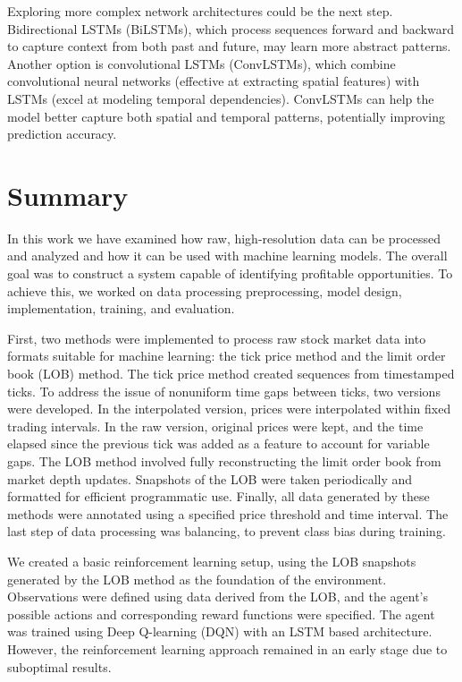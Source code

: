 \documentclass[a4paper,oneside,onecolumn,12pt]{book}
\begin{document}
	Exploring more complex network architectures could be the next step. Bidirectional LSTMs (BiLSTMs), which process sequences forward and backward to capture context from both past and future, may learn more abstract patterns. Another option is convolutional LSTMs (ConvLSTMs), which combine convolutional neural networks (effective at extracting spatial features) with LSTMs (excel at modeling temporal dependencies). ConvLSTMs can help the model better capture both spatial and temporal patterns, potentially improving prediction accuracy.
	\pagebreak

\section*{Summary}
In this work we have examined how raw, high-resolution data can be processed and analyzed and how it can be used with machine learning models. The overall goal was to construct a system capable of identifying profitable opportunities. To achieve this, we worked on data processing preprocessing, model design, implementation, training, and evaluation.

First, two methods were implemented to process raw stock market data into formats suitable for machine learning: the tick price method and the limit order book (LOB) method. The tick price method created sequences from timestamped ticks. To address the issue of nonuniform time gaps between ticks, two versions were developed. In the interpolated version, prices were interpolated within fixed trading intervals. In the raw version, original prices were kept, and the time elapsed since the previous tick was added as a feature to account for variable gaps. The LOB method involved fully reconstructing the limit order book from market depth updates. Snapshots of the LOB were taken periodically and formatted for efficient programmatic use. Finally, all data generated by these methods were annotated using a specified price threshold and time interval. The last step of data processing was balancing, to prevent class bias during training.

We created a basic reinforcement learning setup, using the LOB snapshots generated by the LOB method as the foundation of the environment. Observations were defined using data derived from the LOB, and the agent's possible actions and corresponding reward functions were specified. The agent was trained using Deep Q-learning (DQN) with an LSTM based architecture. However, the reinforcement learning approach remained in an early stage due to suboptimal results.
\end{document}
